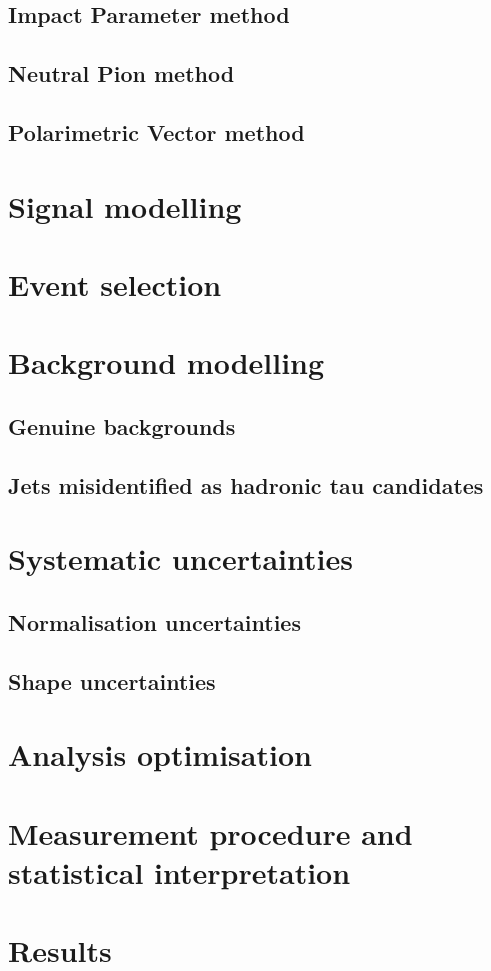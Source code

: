 \documentclass[11pt, a4paper, twoside]{report}
\begin{document}
\subsection{Impact Parameter method}
\subsection{Neutral Pion method}
\subsection{Polarimetric Vector method}
\section{Signal modelling}
\section{Event selection}
\section{Background modelling}
\subsection{Genuine backgrounds}
\subsection{Jets misidentified as hadronic tau candidates}
\section{Systematic uncertainties}
\subsection{Normalisation uncertainties}
\subsection{Shape uncertainties}
\section{Analysis optimisation}
\section{Measurement procedure and statistical interpretation}
\section{Results}
\end{document}
